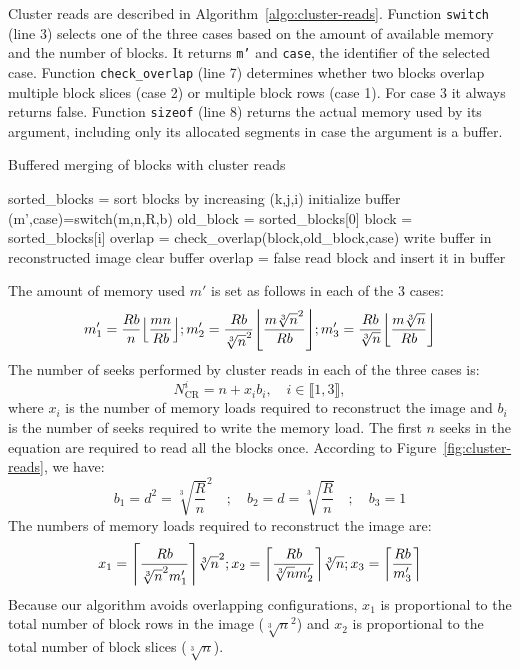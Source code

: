 \documentclass[10pt, conference, compsocconf]{IEEEtran}
\DeclarePairedDelimiter{\ceil}{\lceil}{\rceil}
\DeclarePairedDelimiter{\floor}{\lfloor}{\rfloor}
\begin{document}
Cluster reads are described in
Algorithm~\ref{algo:cluster-reads}. Function \texttt{switch} (line 3)
selects one of the three cases based on the amount of available memory
and the number of blocks. It returns \texttt{m'} and \texttt{case},
the identifier of the selected case. Function \texttt{check\_overlap}
(line 7) determines whether two blocks overlap multiple block slices
(case 2) or multiple block rows (case 1). For case 3 it always returns
false.  Function \texttt{sizeof} (line 8) returns the actual memory
used by its argument, including only its allocated segments in case
the argument is a buffer.
\begin{algorithm}[h]
  \caption{Buffered merging of blocks with cluster reads}
  \label{algo:cluster-reads}
  \begin{algorithmic}[1]
    \STATE sorted\_blocks = sort blocks by increasing (k,j,i)
    \STATE initialize buffer
    \STATE (m',case)=switch(m,n,R,b)
    \STATE old\_block = sorted\_blocks[0]
      \STATE block = sorted\_blocks[i]
      \STATE overlap = check\_overlap(block,old\_block,case)
      \STATE write buffer in reconstructed image
      \STATE clear buffer
      \STATE overlap = false
      \ENDIF
      \STATE read block and insert it in buffer
      \ENDFOR
  \end{algorithmic}
\end{algorithm}

The amount of memory used $m'$ is set as follows in each of the 3 cases:
\begin{equation*}
  m_1' = \frac{Rb}{n}\floor*{\frac{mn}{Rb}};
  m_2' = \frac{Rb}{\sqrt[3]{n}^2}\floor*{\frac{m\sqrt[3]{n}^2}{Rb}};
  m_3' = \frac{Rb}{\sqrt[3]{n}}\floor*{\frac{m\sqrt[3]{n}}{Rb}}
\end{equation*}
The number of seeks performed by cluster reads in each of the three cases is:
\begin{equation*}
  N^i_{\mathrm{CR}} = n + x_ib_i, \quad i \in \llbracket 1, 3\rrbracket,
\end{equation*}
where $x_i$ is the number of memory loads required to reconstruct the
image and $b_i$ is the number of seeks required to write the memory
load. The first $n$ seeks in the equation are required to read all the
blocks once. According to Figure~\ref{fig:cluster-reads}, we have:
\begin{equation*}
  b_1=d^2=\sqrt[3]{\frac{R}{n}}^2 \quad ; \quad b_2=d=\sqrt[3]{\frac{R}{n}} \quad ; \quad b_3=1
\end{equation*}
The
numbers of memory loads required to reconstruct the image are:
\begin{equation*}
  x_1 = \ceil*{\frac{Rb}{\sqrt[3]{n}^2m_1'}}\sqrt[3]{n}^2;
  x_2 = \ceil*{\frac{Rb}{\sqrt[3]{n}m_2'}}\sqrt[3]{n};
  x_3 = \ceil*{\frac{Rb}{m_3'}}
\end{equation*}
Because our algorithm avoids overlapping configurations, $x_1$ is
proportional to the total number of block rows in the image
($\sqrt[3]{n}^2$) and $x_2$ is proportional to the total number of
block slices ($\sqrt[3]{n}$).
\end{document}

